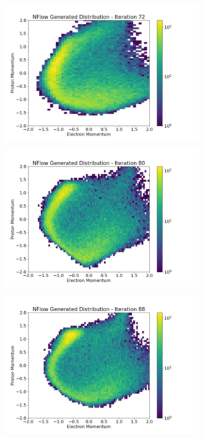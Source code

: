 \documentclass[aspectratio=169]{beamer}
\begin{document}
\begin{frame}[noframenumbering]\centering\includegraphics[width=0.8\textwidth]{images/400training/400training-9.png}\end{frame}
\begin{frame}[noframenumbering]\centering\includegraphics[width=0.8\textwidth]{images/400training/400training-10.png}\end{frame}
\begin{frame}[noframenumbering]\centering\includegraphics[width=0.8\textwidth]{images/400training/400training-11.png}\end{frame}
\end{document}
